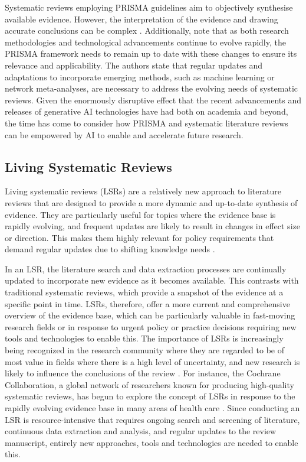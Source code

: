 \documentclass{article}
\begin{document}
Systematic reviews employing PRISMA guidelines aim to objectively synthesise available evidence. However, the interpretation of the evidence and drawing accurate conclusions can be complex \cite{page2021prisma}. 
Additionally, \citet{page2021prisma} note that as both research methodologies and technological advancements continue to evolve rapidly, the PRISMA framework needs to remain up to date with these changes to ensure its relevance and applicability. The authors state that regular updates and adaptations to incorporate emerging methods, such as machine learning or network meta-analyses, are necessary to address the evolving needs of systematic reviews. Given the enormously disruptive effect that the recent advancements and releases of generative AI technologies have had both on academia and beyond, the time has come to consider how PRISMA and systematic literature reviews can be empowered by AI to enable and accelerate future research.

\subsection{Living Systematic Reviews}
Living systematic reviews (LSRs) are a relatively new approach to literature reviews that are designed to provide a more dynamic and up-to-date synthesis of evidence. They are particularly useful for topics where the evidence base is rapidly evolving, and frequent updates are likely to result in changes in effect size or direction. This makes them highly relevant for policy requirements that demand regular updates due to shifting knowledge needs \cite{elliott2017living}.

In an LSR, the literature search and data extraction processes are continually updated to incorporate new evidence as it becomes available. This contrasts with traditional systematic reviews, which provide a snapshot of the evidence at a specific point in time. LSRs, therefore, offer a more current and comprehensive overview of the evidence base, which can be particularly valuable in fast-moving research fields or in response to urgent policy or practice decisions \cite{elliott2017living} requiring new tools and technologies to enable this. The importance of LSRs is increasingly being recognized in the research community where they are regarded to be of most value in fields where there is a high level of uncertainty, and new research is likely to influence the conclusions of the review \cite{elliott2017living}. For instance, the Cochrane Collaboration, a global network of researchers known for producing high-quality systematic reviews, has begun to explore the concept of LSRs in response to the rapidly evolving evidence base in many areas of health care \cite{elliott2017living}. Since conducting an LSR is resource-intensive that requires ongoing search and screening of literature, continuous data extraction and analysis, and regular updates to the review manuscript, entirely new approaches, tools and technologies are needed to enable this.
\end{document}
